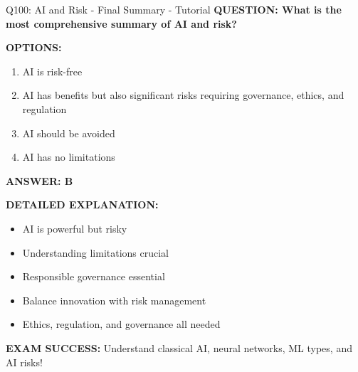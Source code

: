 \documentclass[8pt]{beamer}
\begin{document}
	\begin{frame}{Q100: AI and Risk - Final Summary - Tutorial}
		\fontsize{6.5}{7.5}\selectfont
		\textbf{QUESTION: What is the most comprehensive summary of AI and risk?}
		
		\vspace{0.1cm}
		\textbf{OPTIONS:}
		\begin{enumerate}
			\item AI is risk-free
			\item AI has benefits but also significant risks requiring governance, ethics, and regulation
			\item AI should be avoided
			\item AI has no limitations
		\end{enumerate}
		
		\vspace{0.1cm}
		\textcolor{myblue}{\textbf{ANSWER: B}}
		
		\vspace{0.1cm}
		\textbf{DETAILED EXPLANATION:}
		\begin{itemize}
			\item AI is powerful but risky
			\item Understanding limitations crucial
			\item Responsible governance essential
			\item Balance innovation with risk management
			\item Ethics, regulation, and governance all needed
		\end{itemize}
		
		\vspace{0.1cm}
		\textcolor{myred}{\textbf{EXAM SUCCESS:}} Understand \textcolor{myblue}{classical AI, neural networks, ML types, and AI risks}!
	\end{frame}
	
\end{document}

